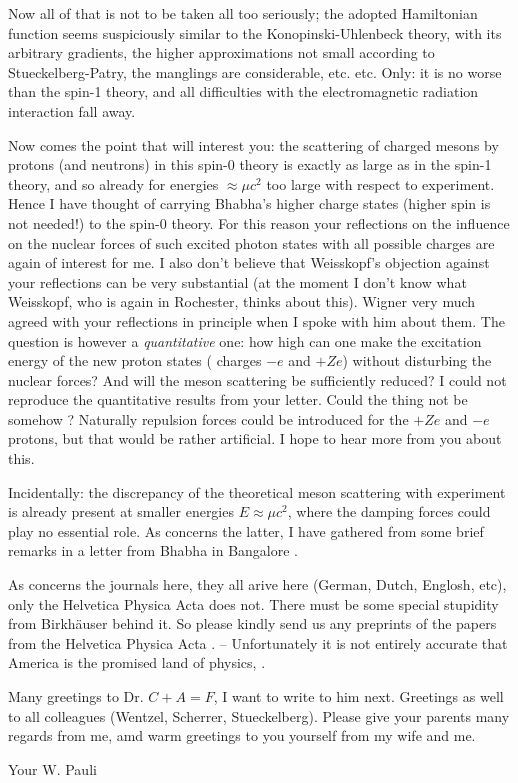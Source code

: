 Now all of that is not to be taken all too seriously; the adopted Hamiltonian function seems suspiciously similar to the Konopinski-Uhlenbeck theory, with its arbitrary gradients, the higher approximations not small according to Stueckelberg-Patry, the manglings are considerable, etc. etc. Only: it is no worse than the spin-1 theory, and all difficulties with the electromagnetic radiation interaction fall away.

Now comes the point that will interest you: the scattering of charged mesons by protons (and neutrons) in this spin-0 theory is exactly as large as in the spin-1 theory, and so already for energies $\approx \mu c^2$ too large with respect to experiment. Hence I have thought of carrying Bhabha's higher charge states (higher spin is not needed!) to the spin-0 theory. For this reason your reflections on the influence on the nuclear forces of such excited photon states with all possible charges are again of interest for me. I also don't believe that Weisskopf's objection against your reflections can be very substantial (at the moment I don't know what Weisskopf, who is again in Rochester, thinks about this). Wigner very much agreed with your reflections in principle when I spoke with him about them. The question is however a \textit{quantitative} one: how high can one make the excitation energy of the new proton states ( charges $-e$ and $+Ze$) without disturbing the nuclear forces? And will the meson scattering be sufficiently reduced? I could not reproduce the quantitative results from your letter. Could the thing not be somehow ? Naturally repulsion forces could be introduced for the $+Ze$ and $-e$ protons, but that would be rather artificial. I hope to hear more from you about this.

Incidentally: the discrepancy of the theoretical meson scattering with experiment is already present at smaller energies $E \approx \mu c^2$, where the damping forces could play no essential role. As concerns the latter, I have gathered from some brief remarks in a letter from Bhabha in Bangalore .

As concerns the journals here, they all arive here (German, Dutch, Englosh, etc), only the Helvetica Physica Acta does not. There must be some special stupidity from Birkh\"auser behind it. So please kindly send us any preprints of the papers from the Helvetica Physica Acta . -- Unfortunately it is not entirely accurate that America is the promised land of physics, .

Many greetings to Dr. $C + A = F$, I want to write to him next. Greetings as well to all colleagues (Wentzel, Scherrer, Stueckelberg). Please give your parents many regards from me, amd warm greetings to you yourself from my wife and me.

Your W. Pauli  

